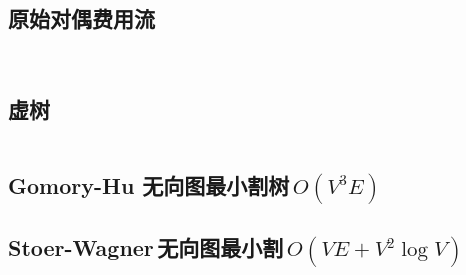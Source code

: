 \documentclass[titlepage, a4paper, 11pt]{article}
\begin{document}
\begin{spacing}{1.15}
				\subsection{原始对偶费用流}
					\inputminted[highlightlines={2,3,22,25,28,31,42,43}]{cpp}{src/TreeandGraph/多路增广费用流.cpp}
					\inputminted{cpp}{src/TreeandGraph/jiangly费用流.cpp}
				\subsection{虚树}
				\inputminted{cpp}{src/TreeandGraph/虚树.cpp}
				
				\subsection{Gomory-Hu 无向图最小割树\,$O(V ^ 3 E)$}
					
				\subsection{Stoer-Wagner\,无向图最小割\,$O(VE + V ^ 2 \log V)$}
					\inputminted{cpp}{src/yzh/Stoer-Wagner.cpp}

\end{spacing}
\end{document}
